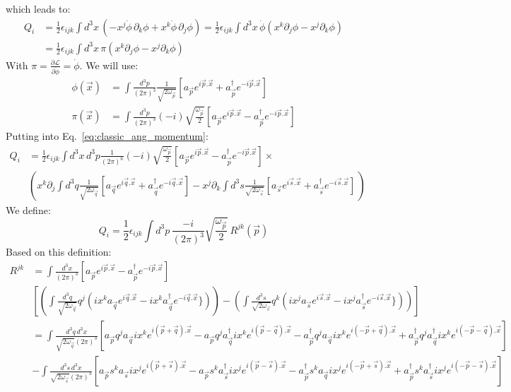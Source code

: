 \documentclass{article}
\newcommand{\onehalf}{\frac{1}{2}}
\newcommand{\pdotx}{\vec{p}.\vec{x}}
\newcommand{\qdotx}{\vec{q}.\vec{x}}
\newcommand{\sdotx}{\vec{s}.\vec{x}}
\newcommand{\asp}{a_{\vec{p}}}
\newcommand{\ass}{a_{\vec{s}}}
\newcommand{\asq}{a_{\vec{q}}}
\newcommand{\adp}{a_{\vec{p}}^\dagger}
\newcommand{\adq}{a_{\vec{q}}^\dagger}
\newcommand{\ads}{a_{\vec{s}}^\dagger}
\newcommand{\vecx}{\vec{x}}
\newcommand{\vecp}{\vec{p}}
\newcommand{\vecq}{\vec{q}}
\newcommand{\vecs}{\vec{s}}
\newcommand{\lagden}{\mathcal{L}}
\begin{document}
which leads to:
\begin{equation}\label{eq:classic_ang_momentum}
\begin{split}
        Q_i &= \frac12 \epsilon_{ijk}\int d^3x\, (-x^j\dot{\phi} \,\partial_k \phi + x^k \dot{\phi}\,\partial_j\phi)=\frac12 \epsilon_{ijk}\int d^3x\, \dot{\phi} (x^k\partial_j\phi - x^j\partial_k\phi)\\
        &= \frac12 \epsilon_{ijk}\int d^3x\, \pi(x^k\partial_j\phi - x^j\partial_k\phi)
        \end{split}
\end{equation}
With $\pi=\frac{\partial\lagden}{\partial\dot{\phi}}=\dot{\phi}$.
We will use:
\begin{equation}
    \begin{split}
        \phi(\vecx) &= \int \frac{d^3p}{(2\pi)^3}\frac{1}{\sqrt{2\omega_{\vecp}}}[\asp e^{i\pdotx} + \adp e^{-i\pdotx}] \\
        \pi(\vecx) &= \int \frac{d^3p}{(2\pi)^3}(-i)\sqrt{\frac{\omega_{\vecp}}{2}}[\asp e^{i\pdotx} - \adp e^{-i\pdotx}]
    \end{split}
\end{equation}
Putting into Eq.~\eqref{eq:classic_ang_momentum}:
\begin{equation}
\begin{split}
    Q_i &=
    \onehalf\epsilon_{ijk}\int d^3x \,d^3p\frac{1}{(2\pi)^6}(-i)\sqrt{\frac{\omega_{\vecp}}{2}}[\asp e^{i\pdotx} - \adp e^{-i\pdotx}]\times\\
    &(x^k\partial_j\int d^3q \frac{1}{\sqrt{2 \omega_{\vec{q}}}}[\asq e^{i\vec{q}.\vecx} +\asq^\dagger e^{-i\vec{q}.\vecx}]-x^j\partial_k\int d^3s \frac{1}{\sqrt{2 \omega_{\vec{s}}}}[a_{\vec{s}} e^{i\vec{s}.\vecx} +a_{\vec{s}}^\dagger e^{-i\vec{s}.\vecx}]\,)
    \end{split}
\end{equation}
We define:
\begin{equation}
    Q_i = \onehalf\epsilon_{ijk}\int d^3p\, \frac{-i}{(2\pi)^3}\sqrt{\frac{\omega_{\vecp}}{2}}\, R^{jk}(\vecp)
\end{equation}
Based on this definition:
\begin{equation}
\begin{split}
    R^{jk} &= \int \frac{d^3x}{(2\pi)^3}[\asp e^{i\pdotx} - \asp^\dagger e^{-i\pdotx}]\\ &\left[ \left(\int \frac{d^3q}{\sqrt{2\omega_{\vec{q}}}}q^j(ix^k\asq e^{i\qdotx} -ix^k \asq^{\dagger}e^{-i\qdotx}\})\right) -  \left(\int \frac{d^3s}{\sqrt{2\omega_{\vec{s}}}}q^k(ix^j\ass e^{i\sdotx} -ix^j \ass^{\dagger}e^{-i\sdotx}\})\right)\right]\\
    & = \int \frac{d^3q\,d^3x}{\sqrt{2\omega_{\vecq}}(2\pi)^3}[\asp q^j\asq ix^ke^{i(\vecp + \vecq).\vecx}-\asp q^j\adq ix^ke^{i(\vecp -
    \vecq).\vecx}-\adp q^j\asq ix^ke^{i(-\vecp + \vecq).\vecx} + \adp q^j\adq ix^ke^{i(-\vecp - \vecq).\vecx}]\\
    & -\int \frac{d^3s\,d^3x}{\sqrt{2\omega_{\vecs}}(2\pi)^3}[\asp s^k\ass ix^je^{i(\vecp + \vecs).\vecx}-\asp s^k\ads ix^je^{i(\vecp -
    \vecs).\vecx}-\adp s^k\asq ix^je^{i(-\vecp + \vecs).\vecx} + \adp s^k\ads ix^je^{i(-\vecp - \vecs).\vecx}]
    \end{split}
\end{equation}
\end{document}
